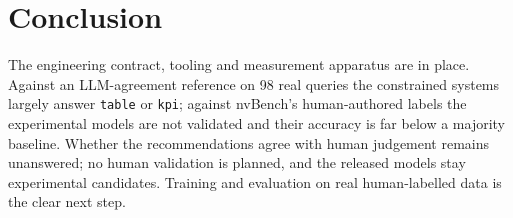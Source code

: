 \documentclass[11pt]{article}
\newcommand{\sql}[1]{\texttt{#1}}
\begin{document}
\section{Conclusion}
The engineering contract, tooling and measurement apparatus are in place. Against an LLM-agreement reference on 98 real queries the constrained systems largely answer \sql{table} or \sql{kpi}; against nvBench's human-authored labels the experimental models are not validated and their accuracy is far below a majority baseline. Whether the recommendations agree with human judgement remains unanswered; no human validation is planned, and the released models stay experimental candidates. Training and evaluation on real human-labelled data is the clear next step.



\end{document}
